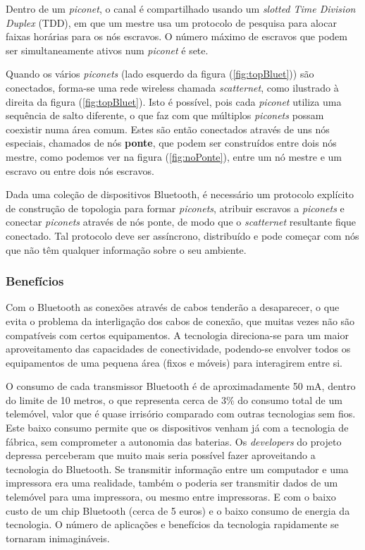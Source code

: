 \documentclass[conference]{IEEEtran}
\begin{document}
Dentro de um \textit{piconet}, o canal é compartilhado usando um \textit{slotted Time Division Duplex} (TDD), em que um mestre usa um protocolo de pesquisa para alocar faixas horárias para os nós escravos. O número máximo de escravos que podem ser simultaneamente ativos num \textit{piconet} é sete. 

Quando os vários \textit{piconets} (lado esquerdo da figura (\ref{fig:topBluet})) são conectados, forma-se uma rede wireless chamada \textit{scatternet}, como ilustrado à direita da figura (\ref{fig:topBluet}).
Isto é possível, pois cada \textit{piconet} utiliza uma sequência de salto diferente, o que faz com que múltiplos \textit{piconets} possam coexistir numa área comum. 
Estes são então conectados através de uns nós especiais, chamados de nós \textbf{ponte}, que podem ser construídos entre dois nós mestre, como podemos ver na figura (\ref{fig:noPonte}), entre um nó mestre e um escravo ou entre dois nós escravos. 

Dada uma coleção de dispositivos Bluetooth, é necessário um protocolo explícito de construção de topologia para formar \textit{piconets}, atribuir escravos a \textit{piconets} e conectar \textit{piconets} através de nós ponte, de modo que o \textit{scatternet} resultante fique conectado. Tal protocolo deve ser assíncrono, distribuído e pode começar com nós que não têm qualquer informação sobre o seu ambiente.

\subsubsection{Benefícios}

Com o Bluetooth as conexões através de cabos tenderão a desaparecer, o que evita o problema da interligação dos cabos de conexão, que muitas vezes não são compatíveis com certos equipamentos. 
A tecnologia direciona-se para um maior aproveitamento das capacidades de conectividade, podendo-se envolver todos os equipamentos de uma pequena área (fixos e móveis) para interagirem entre si. 

O consumo de cada transmissor Bluetooth é de aproximadamente 50 mA, dentro do limite de 10 metros, o que representa cerca de 3\% do consumo total de um telemóvel, valor que é quase irrisório comparado com outras tecnologias sem fios. 
Este baixo consumo permite que os dispositivos venham já com a tecnologia de fábrica, sem comprometer a autonomia das baterias. 
Os \textit{developers} do projeto depressa perceberam que muito mais seria possível fazer aproveitando a tecnologia do Bluetooth. 
Se transmitir informação entre um computador e uma impressora era uma realidade, também o poderia ser transmitir dados de um telemóvel para uma impressora, ou mesmo entre impressoras. 
E com o baixo custo de um chip Bluetooth (cerca de 5 euros) e o baixo consumo de energia da tecnologia. O número de aplicações e benefícios da tecnologia rapidamente se tornaram inimagináveis.
\end{document}
